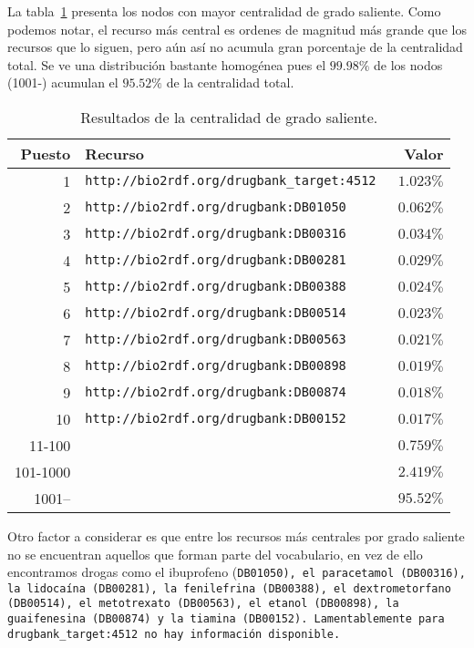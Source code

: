 La tabla~\ref{tab:odcres} presenta los nodos con mayor centralidad de grado
saliente.
Como podemos notar, el recurso más central es ordenes de magnitud más grande
que los recursos que lo siguen, pero aún así no acumula gran porcentaje de la
centralidad total.
Se ve una distribución bastante homogénea pues el $99.98\%$ de los nodos (1001-)
acumulan el $95.52\%$ de la centralidad total.

\begin{table}[ht]
  \centering
  \begin{tabular}{|r|l|r|}\hline
    \bf{Puesto} & \bf{Recurso} & \bf{Valor} \\\hline
     1 & \tt{http://bio2rdf.org/drugbank\_target:4512} & $1.023\%$ \\\hline
     2 & \tt{http://bio2rdf.org/drugbank:DB01050}      & $0.062\%$ \\\hline
     3 & \tt{http://bio2rdf.org/drugbank:DB00316}      & $0.034\%$ \\\hline
     4 & \tt{http://bio2rdf.org/drugbank:DB00281}      & $0.029\%$ \\\hline
     5 & \tt{http://bio2rdf.org/drugbank:DB00388}      & $0.024\%$ \\\hline
     6 & \tt{http://bio2rdf.org/drugbank:DB00514}      & $0.023\%$ \\\hline
     7 & \tt{http://bio2rdf.org/drugbank:DB00563}      & $0.021\%$ \\\hline
     8 & \tt{http://bio2rdf.org/drugbank:DB00898}      & $0.019\%$ \\\hline
     9 & \tt{http://bio2rdf.org/drugbank:DB00874}      & $0.018\%$ \\\hline
    10 & \tt{http://bio2rdf.org/drugbank:DB00152}      & $0.017\%$ \\\hline
    11-100 		& & $0.759\%$ \\\hline
    101-1000  & & $2.419\%$ \\\hline
    1001--    & & $95.52\%$ \\\hline
  \end{tabular}
  \caption{Resultados de la centralidad de grado saliente.}\label{tab:odcres}
\end{table}

Otro factor a considerar es que entre los recursos más centrales por grado
saliente no se encuentran aquellos que forman parte del vocabulario, en vez de
ello encontramos drogas como el ibuprofeno (\tt{DB01050}), el paracetamol
(\tt{DB00316}), la lidocaína (\tt{DB00281}), la fenilefrina (\tt{DB00388}),
el dextrometorfano (\tt{DB00514}), el metotrexato (\tt{DB00563}), el etanol
(\tt{DB00898}), la guaifenesina (\tt{DB00874}) y la tiamina (\tt{DB00152}).
Lamentablemente para \tt{drugbank\_target:4512} no hay información disponible.

